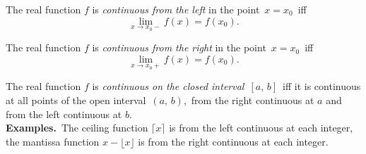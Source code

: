 \documentclass[12pt]{article}
\theoremstyle{definition}
\begin{document}
The real function $f$ is {\em continuous from the left} in the point\, $x = x_0$\, iff
$$\lim_{x\to x_0-}f(x) = f(x_0).$$

The real function $f$ is {\em continuous from the right} in the point\, $x = x_0$\, iff
$$\lim_{x\to x_0+}f(x) = f(x_0).$$

The real function $f$ is {\em continuous on the closed interval} \,$[a,\,b]$\, iff it is continuous at all points of the open interval \,$(a,\,b)$,\, from the right continuous at $a$ and from the left continuous at $b$.\\


\textbf{Examples.}\, The ceiling function $\lceil{x}\rceil$ is from the left continuous at each integer, the mantissa function $x\!-\!\lfloor{x}\rfloor$ is from the right continuous at each integer.





\end{document}

